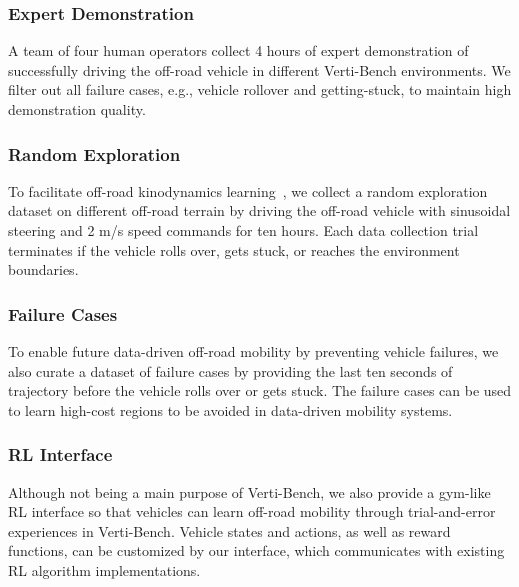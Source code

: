 \subsubsection{Expert Demonstration} 
A team of four human operators collect 4 hours of expert demonstration of successfully driving the off-road vehicle in different Verti-Bench environments. We filter out all failure cases, e.g., vehicle rollover and getting-stuck, to maintain high demonstration quality. 

\subsubsection{Random Exploration}
To facilitate off-road kinodynamics learning~\cite{triest2022tartandrive}, we collect a random exploration dataset on different off-road terrain by driving the off-road vehicle with sinusoidal steering and 2 m/s speed commands for ten hours. Each data collection trial terminates if the vehicle rolls over, gets stuck, or reaches the environment boundaries.

\subsubsection{Failure Cases}
To enable future data-driven off-road mobility by preventing vehicle failures, we also curate a dataset of failure cases by providing the last ten seconds of trajectory before the vehicle rolls over or gets stuck. The failure cases can be used to learn high-cost regions to be avoided in data-driven mobility systems. 

\subsubsection{RL Interface}
Although not being a main purpose of Verti-Bench, we also provide a gym-like RL interface so that vehicles can learn off-road mobility through trial-and-error experiences in Verti-Bench. Vehicle states and actions, as well as reward functions, can be customized by our interface, which communicates with existing RL algorithm implementations. 